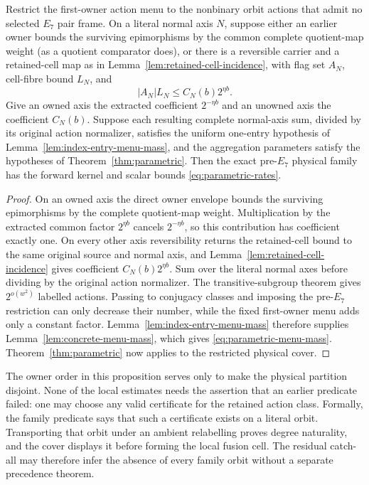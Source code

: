 \begin{proposition}
\label{prop:pre-e7-owner-cell-transfer}
Restrict the first-owner action menu to the nonbinary orbit actions that admit
no selected $E_7$ pair frame.  On a literal normal axis $N$, suppose either
an earlier owner bounds the surviving epimorphisms by the common complete
quotient-map weight (as a quotient comparator does), or there is a reversible
carrier and a retained-cell map as in
Lemma~\ref{lem:retained-cell-incidence}, with flag set $A_N$, cell-fibre bound
$L_N$, and
\[
 |A_N|L_N\leq C_N(b)2^{\eta b}.
\]
Give an owned axis the extracted coefficient $2^{-\eta b}$ and an unowned
axis the coefficient $C_N(b)$.  Suppose each resulting complete normal-axis
sum, divided by its original action normalizer, satisfies the uniform
one-entry hypothesis of Lemma~\ref{lem:index-entry-menu-mass}, and the
aggregation parameters satisfy the hypotheses of
Theorem~\ref{thm:parametric}.  Then the exact pre-$E_7$ physical family has
the forward kernel and scalar bounds \eqref{eq:parametric-rates}.
\end{proposition}
\begin{proof}
On an owned axis the direct owner envelope bounds the surviving epimorphisms
by the complete quotient-map weight.  Multiplication by the extracted common
factor $2^{\eta b}$ cancels $2^{-\eta b}$, so this contribution has coefficient
exactly one.  On every other axis reversibility returns the retained-cell
bound to the same original source and normal axis, and
Lemma~\ref{lem:retained-cell-incidence} gives coefficient
$C_N(b)2^{\eta b}$.  Sum over the literal normal axes before dividing by the
original action normalizer.  The transitive-subgroup theorem gives
$2^{o(w^2)}$ labelled actions.  Passing to conjugacy classes and imposing the
pre-$E_7$ restriction can only decrease their number, while the fixed
first-owner menu adds only a constant factor.  Lemma~\ref{lem:index-entry-menu-mass}
therefore supplies Lemma~\ref{lem:concrete-menu-mass}, which gives
\eqref{eq:parametric-menu-mass}.  Theorem~\ref{thm:parametric} now applies to
the restricted physical cover.
\end{proof}

The owner order in this proposition serves only to make the physical
partition disjoint.  None of the local estimates needs the assertion that an
earlier predicate failed: one may choose any valid certificate for the
retained action class.  Formally, the family predicate says that such a
certificate exists on a literal orbit.  Transporting that orbit under an
ambient relabelling proves degree naturality, and the cover displays it before
forming the local fusion cell.  The residual catch-all may therefore infer
the absence of every family orbit without a separate precedence theorem.

